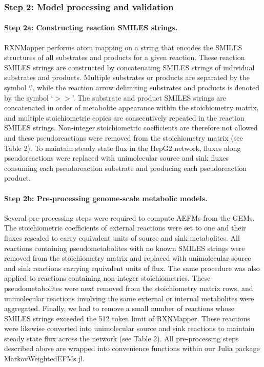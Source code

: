 \documentclass[12pt]{article}
\begin{document}
\subsubsection*{Step 2: Model processing and validation}

\paragraph{Step 2a: Constructing reaction SMILES strings.}

RXNMapper performs atom mapping on a string that encodes the SMILES
structures of all substrates and products for a given reaction. These
reaction SMILES strings are constructed by concatenating SMILES strings of
individual substrates and products. Multiple substrates or products are
separated by the symbol `.', while the reaction arrow delimiting
substrates and products is denoted by the symbol `$>>$'. The substrate and
product SMILES strings are concatenated in order of metabolite appearance
within the stoichiometry matrix, and multiple stoichiometric copies are
consecutively repeated in the reaction SMILES strings. Non-integer
stoichiometric coefficients are therefore not allowed and these
pseudoreactions were removed from the stoichiometry matrix (see Table 2).
To maintain steady state flux in the HepG2 network, fluxes along
pseudoreactions were replaced with unimolecular source and sink fluxes
consuming each pseudoreaction substrate and producing each pseudoreaction
product.

\paragraph{Step 2b: Pre-processing genome-scale metabolic models.}

Several pre-processing steps were required to compute AEFMs from the GEMs.
The stoichiometric coefficients of external reactions were set to one and
their fluxes rescaled to carry equivalent units of source and sink
metabolites. All reactions containing pseudometabolites with no known
SMILES strings were removed from the stoichiometry matrix and replaced
with unimolecular source and sink reactions carrying equivalent units of
flux. The same procedure was also applied to reactions containing
non-integer stoichiometries. These pseudometabolites were next removed
from the stoichiometry matrix rows, and unimolecular reactions involving
the same external or internal metabolites were aggregated. Finally, we had
to remove a small number of reactions whose SMILES strings exceeded the
512 token limit of RXNMapper. These reactions were likewise converted into
unimolecular source and sink reactions to maintain steady state flux
across the network (see Table 2). All pre-processing steps described above
are wrapped into convenience functions within our Julia package
MarkovWeightedEFMs.jl.
\end{document}
